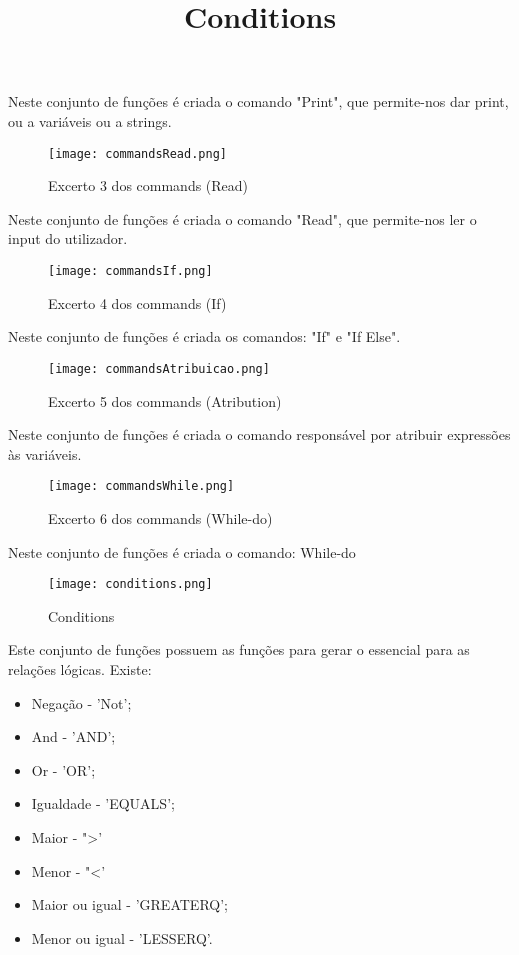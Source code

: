 \documentclass[11pt,a4paper]{report}%
\begin{document}
Neste conjunto de funções é criada o comando "Print", que permite-nos dar print, ou a variáveis ou a strings.



\begin{figure}[htbp]
\centerline{\texttt{[image: commandsRead.png]}}
\caption{Excerto 3 dos commands (Read)}
\label{fig}
\end{figure}

Neste conjunto de funções é criada o comando "Read", que permite-nos ler o input do utilizador.
\newpage

\begin{figure}[htbp]
\centerline{\texttt{[image: commandsIf.png]}}
\caption{Excerto 4 dos commands (If)}
\label{fig}
\end{figure}

Neste conjunto de funções é criada os comandos: "If" e "If Else".

\begin{figure}[htbp]
\centerline{\texttt{[image: commandsAtribuicao.png]}}
\caption{Excerto 5 dos commands (Atribution)}
\label{fig}
\end{figure}

Neste conjunto de funções é criada o comando responsável por atribuir expressões às variáveis.

\begin{figure}[htbp]
\centerline{\texttt{[image: commandsWhile.png]}}
\caption{Excerto 6 dos commands (While-do)}
\label{fig}
\end{figure}

Neste conjunto de funções é criada o comando: While-do
\newpage


\title{\textbf{Conditions}}
\begin{figure}[htbp]
\centerline{\texttt{[image: conditions.png]}}
\caption{Conditions}
\label{fig}
\end{figure}

Este conjunto de funções possuem as funções para gerar o essencial para as relações lógicas.
Existe:
\begin{itemize}
     \item Negação - 'Not';
     \item And - 'AND';
     \item Or - 'OR';
     \item Igualdade - 'EQUALS';
     \item Maior - ">'
     \item Menor - "<'
     \item Maior ou igual - 'GREATERQ';
     \item Menor ou igual - 'LESSERQ'.
  \end{itemize}
\end{document}
